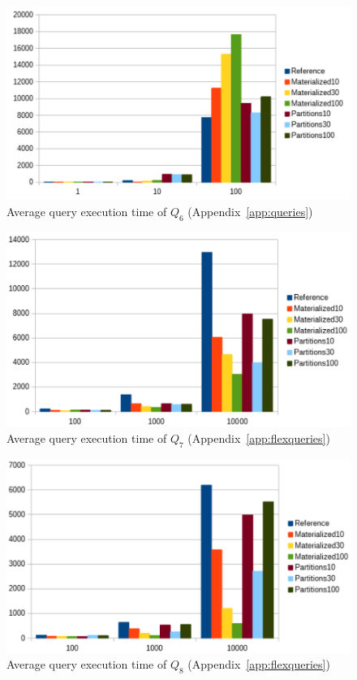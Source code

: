 \begin{figure}[h]
    \centering
    \includegraphics[scale=0.8]{charts/Query6.pdf}
    \caption{Average query execution time of $Q_6$ (Appendix~\ref{app:queries})}
    \label{fig:query6}
\end{figure}



\begin{figure}[h]
    \centering
    \includegraphics[scale=0.75]{charts/Query7.pdf}
    \caption{Average query execution time of $Q_7$ (Appendix~\ref{app:flexqueries})}
    \label{fig:query7}
\end{figure}

\begin{figure}[h]
    \centering
    \includegraphics[scale=0.75]{charts/Query8.pdf}
    \caption{Average query execution time of $Q_8$ (Appendix~\ref{app:flexqueries})}
    \label{fig:query8}
\end{figure}